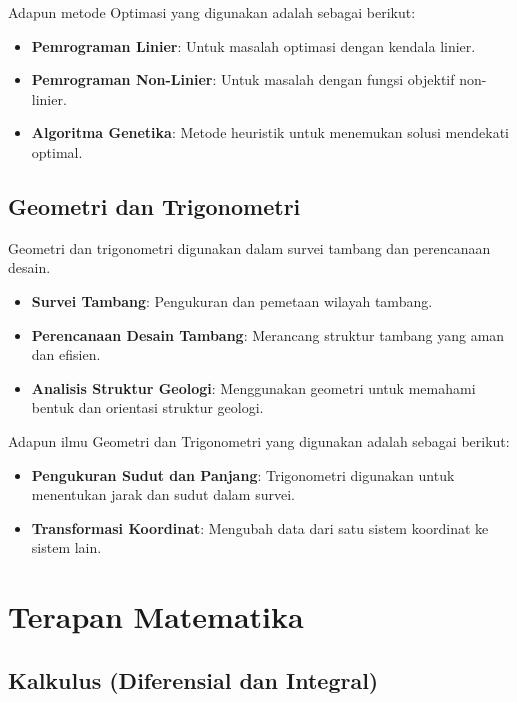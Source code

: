 \documentclass[
]{book}
\providecommand{\tightlist}{%
  \setlength{\itemsep}{0pt}\setlength{\parskip}{0pt}}
\begin{document}
Adapun metode Optimasi yang digunakan adalah sebagai berikut:

\begin{itemize}
\tightlist
\item
  \textbf{Pemrograman Linier}: Untuk masalah optimasi dengan kendala linier.
\item
  \textbf{Pemrograman Non-Linier}: Untuk masalah dengan fungsi objektif non-linier.
\item
  \textbf{Algoritma Genetika}: Metode heuristik untuk menemukan solusi mendekati optimal.
\end{itemize}

\subsection{Geometri dan Trigonometri}\label{geometri-dan-trigonometri}

Geometri dan trigonometri digunakan dalam survei tambang dan perencanaan desain.

\begin{itemize}
\tightlist
\item
  \textbf{Survei Tambang}: Pengukuran dan pemetaan wilayah tambang.
\item
  \textbf{Perencanaan Desain Tambang}: Merancang struktur tambang yang aman dan efisien.
\item
  \textbf{Analisis Struktur Geologi}: Menggunakan geometri untuk memahami bentuk dan orientasi struktur geologi.
\end{itemize}

Adapun ilmu Geometri dan Trigonometri yang digunakan adalah sebagai berikut:

\begin{itemize}
\tightlist
\item
  \textbf{Pengukuran Sudut dan Panjang}: Trigonometri digunakan untuk menentukan jarak dan sudut dalam survei.
\item
  \textbf{Transformasi Koordinat}: Mengubah data dari satu sistem koordinat ke sistem lain.
\end{itemize}

\section{Terapan Matematika}\label{terapan-matematika}

\subsection{Kalkulus (Diferensial dan Integral)}\label{kalkulus-diferensial-dan-integral-1}
\end{document}
